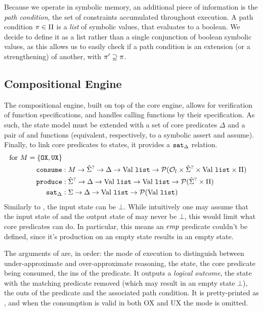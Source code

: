 Because we operate in symbolic memory, an additional piece of information is the \emph{path condition}, the set of constraints accumulated throughout execution. A path condition $\pi\in\Pi$ is a \emph{list} of symbolic values, that evaluates to a boolean. We decide to define it as a list rather than a single conjunction of boolean symbolic values, as this allows us to easily check if a path condition is an extension (or a strengthening) of another, with $\pi'\supseteq\pi$.

\subsection{Compositional Engine}

The compositional engine, built on top of the core engine, allows for verification of function specifications, and handles calling functions by their specification. As such, the state model must be extended with a set of core predicates $\Delta$ and a pair of \consume{} and \produce{} functions (equivalent, respectively, to a symbolic assert and assume). Finally, to link core predicates to states, it provides a $\texttt{sat}_\Delta$ relation.
\begin{align*}
	\text{for }M=\{\texttt{OX}, \texttt{UX}\}\\
	\texttt{consume} &: M\rightarrow \hat{\Sigma}^? \rightarrow \Delta \rightarrow \text{Val}~\texttt{list} \rightarrow {\cal P}({\cal O}_l \times \hat{\Sigma}^? \times \text{Val}~\texttt{list} \times \Pi) \\
	\texttt{produce} &: \hat{\Sigma}^? \rightarrow \Delta \rightarrow \text{Val}~\texttt{list} \rightarrow \text{Val}~\texttt{list} \rightarrow {\cal P}(\hat{\Sigma}^? \times \Pi)\\
	\texttt{sat}_\Delta &:\Sigma \rightarrow \Delta \rightarrow \text{Val}~\texttt{list} \rightarrow {\cal P}(\text{Val}~\texttt{list})
\end{align*}
Similarly to \execac, the input state can be $\bot$. While intuitively one may assume that the input state of \consume{} and the output state of \produce{} may never be $\bot$, this would limit what core predicates can do. In particular, this means an $\textit{emp}$ predicate couldn't be defined, since it's production on an empty state results in an empty state.

The arguments of \consume{} are, in order: the mode of execution to distinguish between under-approximate and over-approximate reasoning, the state, the core predicate being consumed, the ins of the predicate. It outputs a \emph{logical outcome}, the state with the matching predicate removed (which may result in an empty state $\bot$), the outs of the predicate and the associated path condition. It is pretty-printed as , and when the consumption is valid in both OX and UX the mode is omitted.

